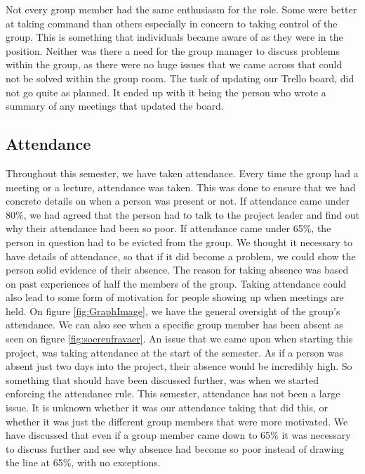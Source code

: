 \documentclass{article}
\begin{document}
Not every group member had the same enthusiasm for the role. 
Some were better at taking command than others especially in concern to taking control of the group.
This is something that individuals became aware of as they were in the position.
Neither was there a need for the group manager to discuss problems within the group, as there were no huge issues that we came across that could not be solved within the group room.
The task of updating our Trello board, did not go quite as planned. 
It ended up with it being the person who wrote a summary of any meetings that updated the board.

\subsection{Attendance}
Throughout this semester, we have taken attendance. 
Every time the group had a meeting or a lecture, attendance was taken. 
This was done to ensure that we had concrete details on when a person was present or not. 
If attendance came under 80\%, we had agreed that the person had to talk to the project leader and find out why their attendance had been so poor. 
If attendance came under 65\%, the person in question had to be evicted from the group. 
We thought it necessary to have details of attendance, so that if it did become a problem, we could show the person solid evidence of their absence. 
The reason for taking absence was based on past experiences of half the members of the group. 
Taking attendance could also lead to some form of motivation for people showing up when meetings are held.
On figure \ref{fig:GraphImage}, we have the general oversight of the group's attendance. We can also see when a specific group member has been absent as seen on figure \ref{fig:soerenfravaer}.
An issue that we came upon when starting this project, was taking attendance at the start of the semester. 
As if a person was absent just two days into the project, their absence would be incredibly high. 
So something that should have been discussed further, was when we started enforcing the attendance rule. 
This semester, attendance has not been a large issue. 
It is unknown whether it was our attendance taking that did this, or whether it was just the different group members that were more motivated.
We have discussed that even if a group member came down to 65\% it was necessary to discuss further and see why absence had become so poor instead of drawing the line at 65\%, with no exceptions.
\end{document}
